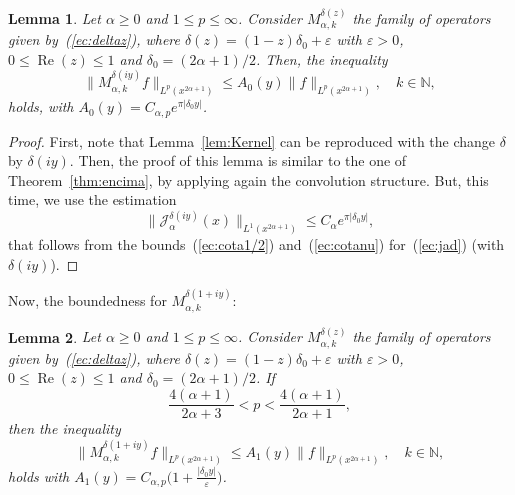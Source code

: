 \documentclass{amsart}
\newtheorem{lem}{Lemma}
\theoremstyle{remark}
\newcommand{\N}{\mathbb{N}}
\renewcommand{\Re}{\operatorname{Re}}
\newcommand{\Jad}[1][\delta]{\mathcal{J}_{\alpha}^{#1}}
\newcommand{\BRkd}[1]{M_{\alpha,k}^{\delta(#1)}} %
\newcommand{\lpnorm}[2]{\|{#1}\|_{L^{#2}(x^{2\alpha+1})}}
\begin{document}
\begin{lem}
\label{lem:cotaiy}
Let $\alpha\ge 0$ and $1 \le p \le \infty$.
Consider $\BRkd{z}$ the family of operators
given by~(\ref{ec:deltaz}), where $\delta(z) = (1-z)\delta_0+\varepsilon$ with
$\varepsilon>0$, $0 \le \Re(z) \le 1$ and $\delta_0 = (2\alpha+1)/2$.
Then, the inequality
\begin{equation*}
    \lpnorm{\BRkd{iy}f}{p} \le A_0(y) \lpnorm{f}{p}, \quad k\in\N,
\end{equation*}
holds, with $A_0(y) = C_{\alpha,p} e^{\pi|\delta_0y|}$.
\end{lem}

\begin{proof}
First, note that Lemma~\ref{lem:Kernel} can be reproduced with the change
$\delta$ by $\delta(iy)$. Then, the proof of this lemma is similar to the one
of Theorem~\ref{thm:encima}, by applying again the convolution structure. But,
this time, we use the estimation
\begin{equation*}
    \lpnorm{\Jad[\delta(iy)](x)}{1}
    \le C_\alpha e^{\pi|\delta_0y|},
\end{equation*}
that follows from the bounds~(\ref{ec:cota1/2}) and~(\ref{ec:cotanu})
for~(\ref{ec:jad}) (with $\delta(iy)$).
\end{proof}

Now, the boundedness for $\BRkd{1+iy}$:

\begin{lem}
\label{lem:cota1+iy}
Let $\alpha\ge 0$ and $1 \le p \le \infty$.
Consider $\BRkd{z}$ the family of operators given by~(\ref{ec:deltaz}), where
$\delta(z) = (1-z)\delta_0+\varepsilon$ with
$\varepsilon>0$, $0 \le \Re(z) \le 1$ and $\delta_0 = (2\alpha+1)/2$. If
\begin{equation}
\label{ec:condiciones}
    \frac{4(\alpha+1)}{2\alpha+3} < p < \frac{4(\alpha+1)}{2\alpha+1},
\end{equation}
then the inequality
\begin{equation*}
    \lpnorm{\BRkd{1+iy}f}{p} \le A_1(y) \lpnorm{f}{p}, \quad k\in\N,
\end{equation*}
holds with
$A_1(y) = C_{\alpha,p} \big(1+\frac{|\delta_0y|}{\varepsilon}\big)$.
\end{lem}
\end{document}
